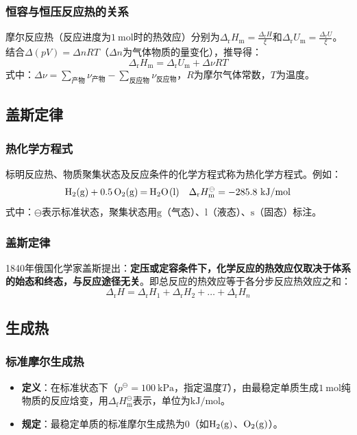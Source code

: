 \subsubsection{恒容与恒压反应热的关系}
摩尔反应热（反应进度为$\qty{1}{\mole}$时的热效应）分别为$\Delta_{\text{r}}H_{\text{m}}=\frac{\Delta_{\text{r}}H}{\xi}$和$\Delta_{\text{r}}U_{\text{m}}=\frac{\Delta_{\text{r}}U}{\xi}$。结合$\Delta(pV)=\Delta nRT$（$\Delta n$为气体物质的量变化），推导得：
\[
\Delta_{\text{r}}H_{\text{m}} = \Delta_{\text{r}}U_{\text{m}} + \Delta\nu RT
\]
式中：$\Delta\nu=\sum_{\text{产物}}\nu_{\text{产物}}-\sum_{\text{反应物}}\nu_{\text{反应物}}$，$R$为摩尔气体常数，$T$为温度。

\subsection{盖斯定律}
\subsubsection{热化学方程式}
标明反应热、物质聚集状态及反应条件的化学方程式称为热化学方程式。例如：
\[
\ce{H2(g) + 0.5O2(g) = H2O(l)} \quad \Delta_{\text{r}}H_{\text{m}}^\ominus = -285.8\ \si{\kilo\joule\per\mole}
\]
式中：$\ominus$表示标准状态，聚集状态用$\text{g}$（气态）、$\text{l}$（液态）、$\text{s}$（固态）标注。

\subsubsection{盖斯定律}
1840年俄国化学家盖斯提出：\textbf{定压或定容条件下，化学反应的热效应仅取决于体系的始态和终态，与反应途径无关}。即总反应的热效应等于各分步反应热效应之和：
\[
\Delta_{\text{r}}H = \Delta_{\text{r}}H_1 + \Delta_{\text{r}}H_2 + \dots + \Delta_{\text{r}}H_n
\]

\subsection{生成热}
\subsubsection{标准摩尔生成热}
\begin{itemize}
    \item \textbf{定义}：在标准状态下（$p^\ominus=100\ \text{kPa}$，指定温度$T$），由最稳定单质生成$\qty{1}{\mole}$纯物质的反应焓变，用$\Delta_{\text{f}}H_{\text{m}}^\ominus$表示，单位为$\si{\kilo\joule\per\mole}$。
    \item \textbf{规定}：最稳定单质的标准摩尔生成热为$0$（如$\ce{H2(g)}$、$\ce{O2(g)}$）。
\end{itemize}

